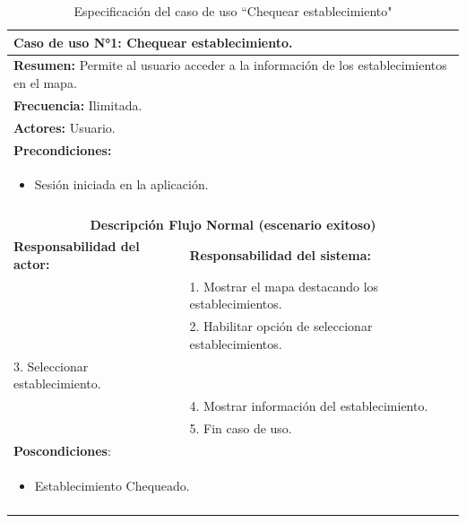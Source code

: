 \begin{table}[H]
    \centering
    \caption{Especificación del caso de uso ``Chequear establecimiento"}
    \begin{tabularx}{\textwidth}{|X|X|}
        \hline
        \multicolumn{2}{|l|}{\textbf{Caso de uso N°1:} Chequear establecimiento.}\\\hline
        \multicolumn{2}{|l|}{\textbf{Resumen:} Permite al usuario acceder a la información de los establecimientos en el mapa.}\\\hline
        \multicolumn{2}{|l|}{\textbf{Frecuencia:} Ilimitada.}\\\hline
        \multicolumn{2}{|l|}{\textbf{Actores:} Usuario.}\\\hline
        \multicolumn{2}{|l|}{\textbf{Precondiciones:}}\\
        \multicolumn{2}{|l|}{\begin{minipage}[t]{0.8\textwidth}
        \begin{itemize}
            \item Sesión iniciada en la aplicación.
        \end{itemize}
        \end{minipage}}\\
        \multicolumn{2}{|l|}{}\\\hline
        \multicolumn{2}{|c|}{\textbf{Descripci\'on Flujo Normal (escenario exitoso)}}\\\hline
        \textbf{Responsabilidad del actor:} & \textbf{Responsabilidad del sistema:}\\ \hline
        &1. Mostrar el mapa destacando los establecimientos.\\
        &2. Habilitar opción de seleccionar establecimientos.\\
        3. Seleccionar establecimiento.&\\
        &4. Mostrar información del establecimiento.\\
        &5. Fin caso de uso.\\\hline
        \multicolumn{2}{|l|}{\textbf{Poscondiciones}:}\\
        \multicolumn{2}{|l|}{\begin{minipage}[t]{0,4\textwidth}
        \begin{itemize}
            \item Establecimiento Chequeado.
        \end{itemize}
        \end{minipage}}\\
        \multicolumn{2}{|l|}{}\\\hline        
    \end{tabularx}
    \label{usecase1}
\end{table}

